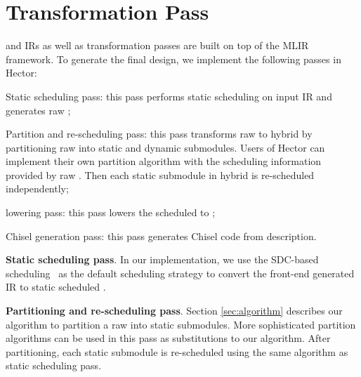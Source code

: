 \section{Transformation Pass}

\tor and \hec IRs as well as transformation passes are built on top of the MLIR framework. To generate the final design, we implement the following passes in Hector: 
\begin{enumerate*}
\item Static scheduling pass: this pass performs static scheduling on input IR and generates raw \tor; \item Partition and re-scheduling pass: this pass transforms raw \tor to hybrid \tor by partitioning raw \tor into static and dynamic submodules. Users of Hector can implement their own partition algorithm with the scheduling information provided by raw \tor. Then each static submodule in hybrid \tor is re-scheduled independently; \item \tor lowering pass: this pass lowers the scheduled \tor to \hec; \item Chisel generation pass: this pass generates Chisel code from \hec description.
\end{enumerate*}


\textbf{Static scheduling pass}.
In our implementation, we use the SDC-based scheduling~\cite{sdc-modulo-13} as the default scheduling strategy to convert the front-end generated IR to static scheduled \dsir{}.

\textbf{Partitioning and re-scheduling pass}.
Section \ref{sec:algorithm} describes our algorithm to partition a raw \tor into static submodules. More sophisticated partition algorithms can be used in this pass as substitutions to our algorithm. After partitioning, each static submodule is re-scheduled using the same algorithm as static scheduling pass.

